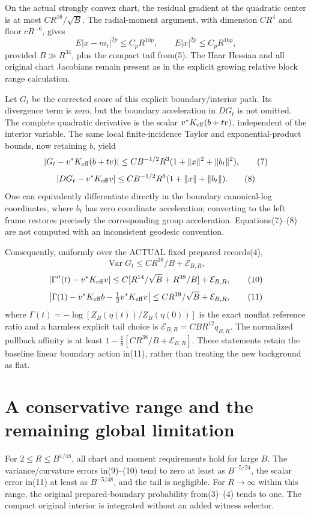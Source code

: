 \documentclass{article}
\begin{document}
On the actual strongly convex chart, the residual gradient at the quadratic center is at most $CR^{16}/\sqrt B$. The radial-moment argument, with dimension $CR^4$ and floor $cR^{-6}$, gives
\[
 E|x-m_t|^{2p}\le C_pR^{10p},\qquad
 E|x|^{2p}\le C_pR^{16p},                             \tag{6}
\]
provided $B\gg R^{34}$, plus the compact tail from(5). The Haar Hessian and all original chart Jacobians remain present as in the explicit growing relative block range calculation.

Let $G_t$ be the corrected score of this explicit boundary/interior path. Its divergence term is zero, but the boundary acceleration in $DG_t$ is not omitted. The complete quadratic derivative is the scalar
$v^*K_{\rm eff}(b+tv)$, independent of the interior variable. The same local finite-incidence Taylor and exponential-product bounds, now retaining $b$, yield
\[
 |G_t-v^*K_{\rm eff}(b+tv)|
 \le C B^{-1/2}R^3(1+\|x\|^2+\|b_t\|^2),             \tag{7}
\]
\[
 |DG_t-v^*K_{\rm eff}v|
 \le C B^{-1/2}R^6(1+\|x\|+\|b_t\|).                 \tag{8}
\]
One can equivalently differentiate directly in the boundary canonical-log coordinates, where $b_t$ has zero coordinate acceleration; converting to the left frame restores precisely the corresponding group acceleration. Equations(7)--(8) are not computed with an inconsistent geodesic convention.

Consequently, uniformly over the ACTUAL fixed prepared records(4),
\[
 \operatorname{Var}G_t\le C R^{38}/B+\mathcal E_{B,R}, \tag{9}
\]
\[
 |\Gamma''(t)-v^*K_{\rm eff}v|
 \le C[R^{14}/\sqrt B+R^{38}/B]+\mathcal E_{B,R},    \tag{10}
\]
\[
 \left|\Gamma(1)-v^*K_{\rm eff}b-\tfrac12v^*K_{\rm eff}v\right|
 \le C R^{19}/\sqrt B+\mathcal E_{B,R},               \tag{11}
\]
where $\Gamma(t)=-\log[Z_B(\eta(t))/Z_B(\eta(0))]$ is the exact nonflat reference ratio and a harmless explicit tail choice is
$\mathcal E_{B,R}=CBR^{12}q_{B,R}$.
The normalized pullback affinity is at least
$1-\frac18[C R^{38}/B+\mathcal E_{B,R}]$.
These statements retain the baseline linear boundary action in(11), rather than treating the new background as flat.

\section*{A conservative range and the remaining global limitation}
For $2\le R\le B^{1/48}$, all chart and moment requirements hold for large $B$. The variance/curvature errors in(9)--(10) tend to zero at least as $B^{-5/24}$, the scalar error in(11) at least as $B^{-5/48}$, and the tail is negligible. For $R\to\infty$ within this range, the original prepared-boundary probability from(3)--(4) tends to one. The compact original interior is integrated without an added witness selector.
\end{document}
